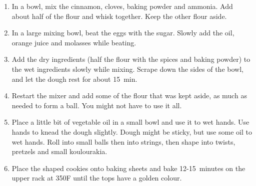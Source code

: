 \begin{enumerate}
    \item In a bowl, mix the cinnamon, cloves, baking powder and ammonia. Add about half of the flour and whisk together. Keep the other flour aside.
    \item In a large mixing bowl, beat the eggs with the sugar. Slowly add the oil, orange juice and molasses while beating.
    \item Add the dry ingredients (half the flour with the spices and baking powder) to the wet ingredients slowly while mixing. Scrape down the sides of the bowl, and let the dough rest for about 15~min.
    \item Restart the mixer and add some of the flour that was kept aside, as much as needed to form a ball. You might not have to use it all.
    \item Place a little bit of vegetable oil in a small bowl and use it to wet hands. Use hands to knead the dough slightly. Dough might be sticky, but use some oil to wet hands. Roll into small balls then into strings, then shape into twists, pretzels and small koulourakia.
    \item Place the shaped cookies onto baking sheets and bake 12-15~minutes on the upper rack at 350\degree F until the tops have a golden colour.
\end{enumerate}
